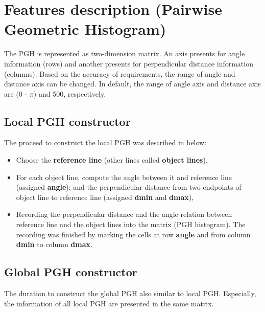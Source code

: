 \section{Features description (Pairwise Geometric Histogram)}
The PGH is represented as two-dimension matrix. An axis presents for angle information (rows) and another presents for perpendicular distance information (columns). Based on the accuracy of requirements, the range of angle and distance axis can be changed. In default, the range of angle axis and distance axis are ($0$ - $\pi$) and 500, respectively.
\subsection{Local PGH constructor}
The proceed to construct the local PGH was described in below:
\begin{itemize}
\item Choose the \textbf{reference line} (other lines called \textbf{object lines}),
\item For each object line, compute the angle between it and reference line (assigned \textbf{angle}); and the perpendicular distance from two endpoints of object line to reference line (assigned \textbf{dmin} and \textbf{dmax}),
\item Recording the perpendicular distance and the angle relation between reference line and the object lines into the matrix (PGH histogram). The recording was finished by marking the cells at row \textbf{angle} and from column \textbf{dmin} to column \textbf{dmax}.
\end{itemize}
\subsection{Global PGH constructor}
The duration to construct the global PGH also similar to local PGH. Especially, the information of all local PGH are presented in the same matrix.
